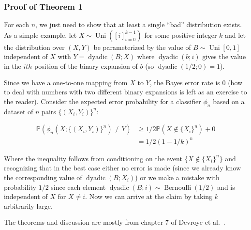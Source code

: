 \documentclass[12pt]{article}
\begin{document}
\subsubsection*{Proof of Theorem 1}

For each $n$, we just need to
show that at least a single ``bad'' distribution exists. As a simple
example, let $X \sim \operatorname{Uni}([i]_{i=0}^{k-1})$ for some
positive integer $k$ and let the distribution over $(X, Y)$ be parameterized by the
value of $B \sim \operatorname{Uni}[0, 1]$ independent of $X$ with $Y =
\operatorname{dyadic}(B; X)$ where $\operatorname{dyadic}(b; i)$ gives
the value in the $ith$ position of the binary expansion of $b$ (so
$\operatorname{dyadic}(1/2; 0) = 1$).

Since we have a one-to-one mapping from $X$ to $Y$, the Bayes error
rate is $0$ (how to deal with numbers with two different binary
expansions is left as an exercise to the reader). Consider the
expected error probability for a classifier $\phi_n$ based on a
dataset of $n$ pairs $\{(X_i, Y_i)\}^n$:

\begin{align}
  \mathbb{P}(\phi_n(X; \{(X_i, Y_i)\}^n) \neq Y) &\geq 1/2 \mathbb{P}(X \not \in \{X_i\}^n) + 0\\
  &= 1/2 (1- 1/k)^n
\end{align}

Where the inequality follows from conditioning on the event
\(\{X \not \in \{X_i\}^n\}\) and recognizing that in the best case
either no error is made (since we already know the corresponding value
of \(\operatorname{dyadic}(B; X_i)\)) or we make a mistake with
probability \(1/2\) since each element
\(\operatorname{dyadic}(B; i) \sim \operatorname{Bernoulli}(1/2)\) and
is independent of \(X\) for \(X \neq i\). Now we can arrive at the
claim by taking \(k\) arbitrarily large.

The theorems and discussion are mostly from chapter 7 of Devroye et
al.~\cite{devroye-1996-pattern}.



\end{document}
